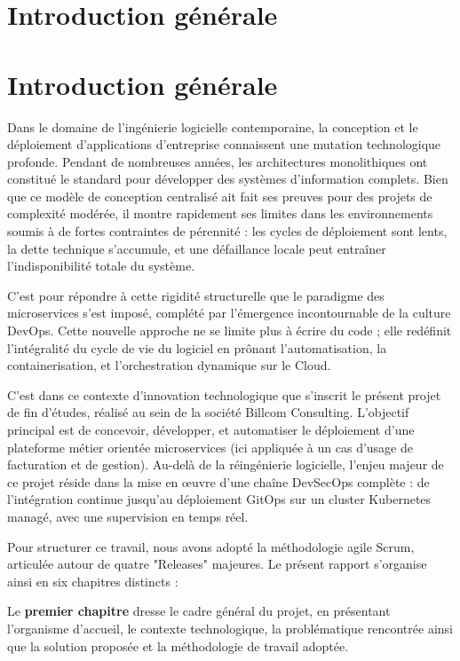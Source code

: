 \section*{Introduction générale}

\section*{Introduction générale}

Dans le domaine de l'ingénierie logicielle contemporaine, la conception et le déploiement d'applications d'entreprise connaissent une mutation technologique profonde. Pendant de nombreuses années, les architectures monolithiques ont constitué le standard pour développer des systèmes d'information complets. Bien que ce modèle de conception centralisé ait fait ses preuves pour des projets de complexité modérée, il montre rapidement ses limites dans les environnements soumis à de fortes contraintes de pérennité : les cycles de déploiement sont lents, la dette technique s'accumule, et une défaillance locale peut entraîner l'indisponibilité totale du système. 

C'est pour répondre à cette rigidité structurelle que le paradigme des microservices s'est imposé, complété par l'émergence incontournable de la culture DevOps. Cette nouvelle approche ne se limite plus à écrire du code ; elle redéfinit l'intégralité du cycle de vie du logiciel en prônant l'automatisation, la containerisation, et l'orchestration dynamique sur le Cloud.

C'est dans ce contexte d'innovation technologique que s'inscrit le présent projet de fin d'études, réalisé au sein de la société Billcom Consulting. L'objectif principal est de concevoir, développer, et automatiser le déploiement d'une plateforme métier orientée microservices (ici appliquée à un cas d'usage de facturation et de gestion). Au-delà de la réingénierie logicielle, l'enjeu majeur de ce projet réside dans la mise en \oe{}uvre d'une chaîne DevSecOps complète : de l'intégration continue jusqu'au déploiement GitOps sur un cluster Kubernetes managé, avec une supervision en temps réel.

Pour structurer ce travail, nous avons adopté la méthodologie agile Scrum, articulée autour de quatre "Releases" majeures. Le présent rapport s'organise ainsi en six chapitres distincts :

Le \textbf{premier chapitre} dresse le cadre général du projet, en présentant l'organisme d'accueil, le contexte technologique, la problématique rencontrée ainsi que la solution proposée et la méthodologie de travail adoptée.

